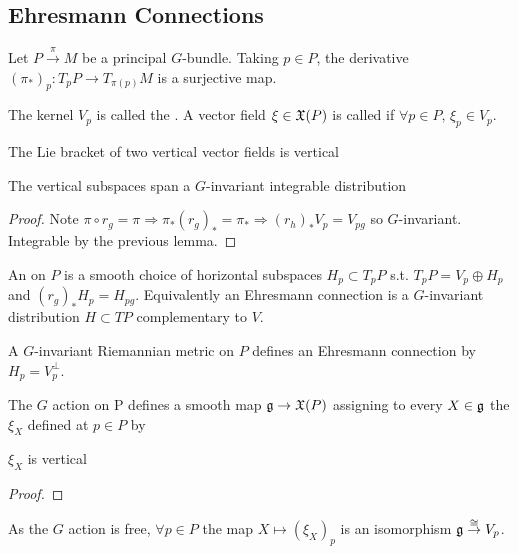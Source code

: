 \documentclass{article}
\begin{document}
\subsection{Ehresmann Connections}
Let $P \overset{\pi}{\to} M$ be a principal $G$-bundle. Taking $p \in P$, the derivative $(\pi_\ast)_p : T_p P \to T_{\pi(p)}M$ is a surjective map. 
\begin{definition}
	The kernel $V_p$ is called the . A vector field $\xi \in \mathfrak{X}(P)$ is called  if $\forall p \in P, \, \xi_p \in V_p$. 
\end{definition}

\begin{lemma}
	The Lie bracket of two vertical vector fields is vertical
\end{lemma}

\begin{lemma}
	The vertical subspaces span a $G$-invariant integrable distribution
\end{lemma}
\begin{proof}
	Note $\pi \circ r_g = \pi \Rightarrow \pi_\ast (r_g)_\ast = \pi_\ast \Rightarrow (r_h)_\ast V_p = V_{pg}$ so $G$-invariant. Integrable by the previous lemma.
\end{proof}

\begin{definition}
	An  on $P$ is a smooth choice of horizontal subspaces $H_p \subset T_p P$ s.t. $T_p P = V_p \oplus H_p$ and $(r_g)_\ast H_p = H_{pg}$. Equivalently an Ehresmann connection is a $G$-invariant distribution $H \subset TP$ complementary to $V$. 
\end{definition}

\begin{example}
	A $G$-invariant Riemannian metric on $P$ defines an Ehresmann connection by $H_p = V_p^\perp$. 
\end{example}

The $G$ action on P defines a smooth map $\mathfrak{g} \to \mathfrak{X}(P)$ assigning to every $X\in \mathfrak{g}$ the   $\xi_X$ defined at $p \in P$ by  

\begin{lemma}
	$\xi_X$ is vertical
\end{lemma}
\begin{proof}
\end{proof}
As the $G$ action is free, $\forall p \in P$ the map $X \mapsto (\xi_X)_p$ is an isomorphism $\mathfrak{g} \overset{\cong}{\to} V_p$. 
\end{document}
